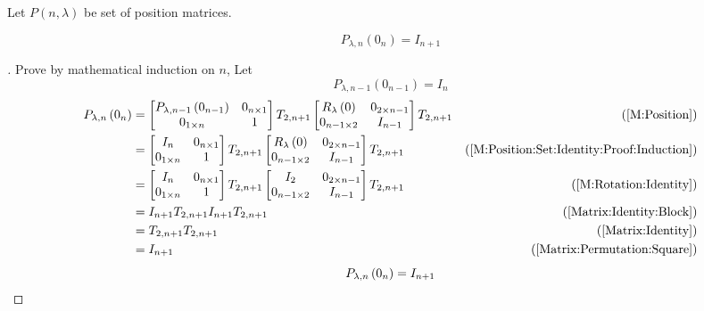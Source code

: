 \documentclass[../main.tex]{subfiles}
\begin{document}
\begin{definition}\label{M:Position:Set}
Let $P\left(n,\lambda\right)$ be set of position matrices.
\end{definition}
\begin{corollary}\label{M:Position:Set:Identity}
\begin{equation*}
P_{\lambda,n}
\left(0_{n}\right)
=
I_{n+1}
\end{equation*}
\end{corollary}
\begin{proof}[]
Prove by mathematical induction on $n$,
Let
\begin{equation}\label{M:Position:Set:Identity:Proof:Induction}
P_{\lambda,n-1}\left(0_{n-1}\right)=I_n
\end{equation}
\begin{align*}
P_{\lambda, n}\left(0_{n}\right)
&=
\begin{bmatrix}
P_{\lambda,n-1}\left(0_{n-1}\right)&0_{n\times 1}\\
0_{1\times n}&1\\
\end{bmatrix}
T_{2, n+1}
\begin{bmatrix}
R_{\lambda}\left(0\right)&0_{{2}\times{n-1}}\\
0_{{n-1}\times{2}}&{I}_{n-1}\\
\end{bmatrix}
T_{2, n+1}
&\text{(\cref{M:Position})}\\
&=
\begin{bmatrix}
I_{n}&0_{n\times 1}\\
0_{1\times n}&1\\
\end{bmatrix}
T_{2, n+1}
\begin{bmatrix}
R_{\lambda}\left(0\right)&0_{{2}\times{n-1}}\\
0_{{n-1}\times{2}}&{I}_{n-1}\\
\end{bmatrix}
T_{2, n+1}
&\text{(\cref{M:Position:Set:Identity:Proof:Induction})}\\
&=
\begin{bmatrix}
I_{n}&0_{n\times 1}\\
0_{1\times n}&1\\
\end{bmatrix}
T_{2, n+1}
\begin{bmatrix}
I_{2}&0_{{2}\times{n-1}}\\
0_{{n-1}\times{2}}&{I}_{n-1}\\
\end{bmatrix}
T_{2, n+1}
&\text{(\cref{M:Rotation:Identity})}\\
&=
I_{n+1}
T_{2, n+1}
I_{n+1}
T_{2, n+1}
&\text{(\cref{Matrix:Identity:Block})}\\
&=
T_{2, n+1}
T_{2, n+1}
&\text{(\cref{Matrix:Identity})}\\
&=
I_{n+1}
&\text{(\cref{Matrix:Permutation:Square})}
\end{align*}
\begin{equation*}
P_{\lambda,n}
\left(0_{n}\right)
=
I_{n+1}
\qedhere
\end{equation*}
\end{proof}
\end{document}
